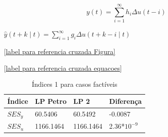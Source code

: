 \begin{equation}
	\label{label para referencia cruzada equacoes} 
	y(t)=\sum_{i=1}^{\infty}h_i\Delta u(t-i)
\end{equation}

$\hat{y}(t+k\mid t)= \sum^\infty_{i=1} g_i \Delta u(t+k-i\mid t)$


\cite{Camacho2007} 

\ref{label para referencia cruzada Figura}

\ref{label para referencia cruzada equacoes}



\begin{table}[h]
\begin{center}
     \caption{Índices 1 para casos factíveis}
     \begin{tabular}{| l | l | l | l |}
     \hline Índice & LP Petro & LP 2 & Diferença\\ 
     \hline $SES_y$& 60.5406 & 60.5492 & -0.0087\\
     \hline $SES_u$& 1166.1464 & 1166.1464 & 2.36*$10^{-9}$ \\
     \hline
     \end{tabular}
\label{table:indices1}
\end{center}
\end{table}